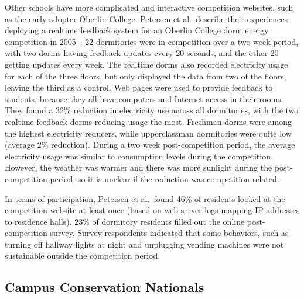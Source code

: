 Other schools have more complicated and interactive competition websites, such as the early adopter Oberlin College. Petersen et al.\ describe their experiences deploying a realtime feedback system for an Oberlin College dorm energy competition in 2005~\cite{petersen-dorm-energy-reduction,Petersen07a}. 22 dormitories were in competition over a two week period, with two dorms having feedback updates every 20 seconds, and the other 20 getting updates every week. The realtime dorms also recorded electricity usage for each of the three floors, but only displayed the data from two of the floors, leaving the third as a control. Web pages were used to provide feedback to students, because they all have computers and Internet access in their rooms. They found a 32\% reduction in electricity use across all dormitories, with the two realtime feedback dorms reducing usage the most. Freshman dorms were among the highest electricity reducers, while upperclassman dormitories were quite low (average 2\% reduction). During a two week post-competition period, the average electricity usage was similar to consumption levels during the competition. However, the weather was warmer and there was more sunlight during the post-competition period, so it is unclear if the reduction was competition-related.

In terms of participation, Petersen et al.\ found 46\% of residents looked at the competition website at least once (based on web server logs mapping IP addresses to residence halls). 23\% of dormitory residents filled out the online post-competition survey. Survey respondents indicated that some behaviors, such as turning off hallway lights at night and unplugging vending machines were not sustainable outside the competition period.

\subsection{Campus Conservation Nationals}

